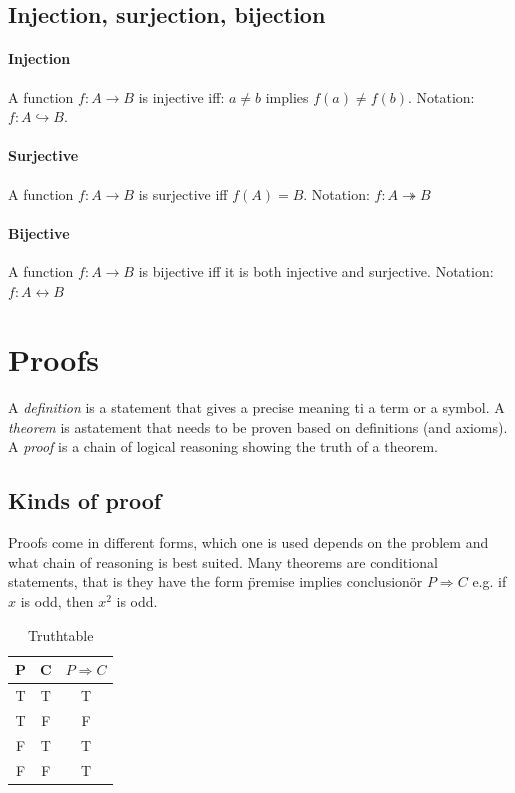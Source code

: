 \documentclass[12pt]{article} %
\begin{document}
\subsection{Injection, surjection, bijection}

\paragraph{Injection} A function $f: A \to B$ is injective iff: $a \neq b$ implies $f(a) \neq f(b)$. Notation: $f: A \hookrightarrow B$.

\paragraph{Surjective} A function $f: A \to B$ is surjective iff $f(A) = B$. Notation: $f: A \twoheadrightarrow B$

\paragraph{Bijective} A function $f: A \to B$ is bijective iff it is both injective and surjective. Notation: $f: A \leftrightarrow B$

\section{Proofs}
A \textit{definition} is a statement that gives a precise meaning ti a term or a symbol. A \textit{theorem} is astatement that needs to be proven based on definitions (and axioms). A \textit{proof} is a chain of logical reasoning showing the truth of a theorem.

\subsection{Kinds of proof}
Proofs come in different forms, which one is used depends on the problem and what chain of reasoning is best suited. Many theorems are conditional statements, that is they have the form \"premise implies conclusion\" or $P \Rightarrow C$ e.g. if $x$ is odd, then $x^2$ is odd.

\begin{table}[h!]
\centering
    \begin{tabular}{ | c | c | c |}
      \hline
      P & C &  $P \Rightarrow C$ \\
      \hline
      T & T & T \\
      T & F & F \\
      F & T & T \\
      F & F & T \\
      \hline
    \end{tabular}
\caption{Truthtable}
\label{table: 1}
\end{table}
\end{document}
